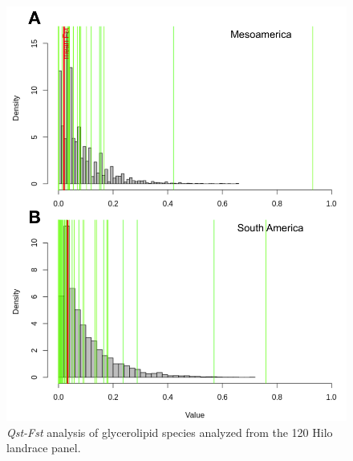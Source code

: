 \documentclass[9pt,twocolumn,twoside,lineno]{gsajnl}
\begin{document}
\begin{figure}[t]
\begin{center}
\includegraphics[width=0.4\paperwidth]{Sup_Figures/Sup_Fig_2.png}
\caption{\textit{Qst-Fst} analysis of glycerolipid species analyzed from the 120 Hilo landrace panel. 
}
\label{s-fig1}
\end{center}
\end{figure} 
\end{document}
